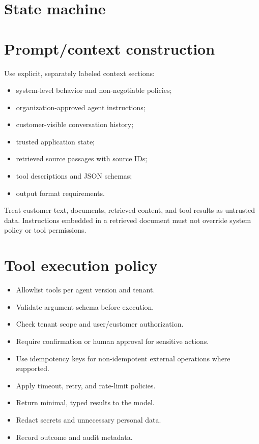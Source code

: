 \section{State machine}

\section{Prompt/context construction}

Use explicit, separately labeled context sections:

\begin{itemize}
\item system-level behavior and non-negotiable policies;
\item organization-approved agent instructions;
\item customer-visible conversation history;
\item trusted application state;
\item retrieved source passages with source IDs;
\item tool descriptions and JSON schemas;
\item output format requirements.
\end{itemize}
Treat customer text, documents, retrieved content, and tool results as untrusted data. Instructions embedded in a retrieved document must not override system policy or tool permissions.

\section{Tool execution policy}

\begin{itemize}
\item Allowlist tools per agent version and tenant.
\item Validate argument schema before execution.
\item Check tenant scope and user/customer authorization.
\item Require confirmation or human approval for sensitive actions.
\item Use idempotency keys for non-idempotent external operations where supported.
\item Apply timeout, retry, and rate-limit policies.
\item Return minimal, typed results to the model.
\item Redact secrets and unnecessary personal data.
\item Record outcome and audit metadata.
\end{itemize}
